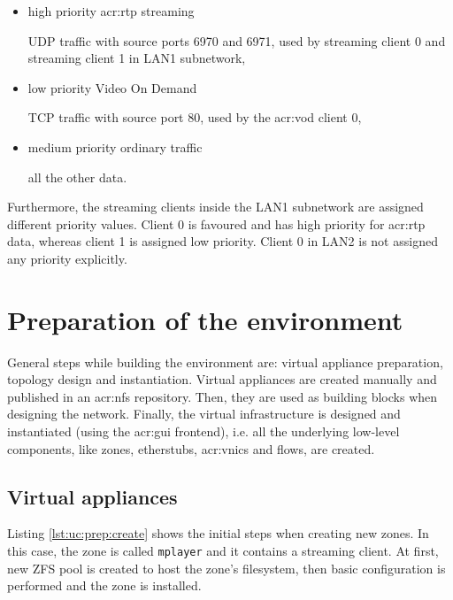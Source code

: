 \documentclass[11pt,openany]{book}
\begin{document}
        \begin{itemize}

          \item high priority \gls{acr:rtp} streaming

                UDP traffic with source ports 6970 and 6971, used by streaming client 0
                and streaming client 1 in LAN1 subnetwork,

          \item low priority Video On Demand
          
                TCP traffic with source port 80, used by the \gls{acr:vod} client 0,

          \item medium priority ordinary traffic
          
                all the other data.

        \end{itemize}

        Furthermore, the streaming clients inside the LAN1 subnetwork are assigned different priority values. Client 0
        is favoured and has high priority for \gls{acr:rtp} data, whereas client 1 is assigned low priority. Client 0 in
        LAN2 is not assigned any priority explicitly.


    \section{Preparation of the environment}
    \label{sec:uc:prep}

      General steps while building the environment are: virtual appliance preparation, topology design and
      instantiation. Virtual appliances are created manually and published in an \gls{acr:nfs} repository. Then, they
      are used as building blocks when designing the network. Finally, the virtual infrastructure is designed and
      instantiated (using the \gls{acr:gui} frontend), i.e.  all the underlying low-level components, like zones,
      etherstubs, \gls{acr:vnic}s and flows, are created.


      \subsection{Virtual appliances}
      \label{ssub:case:prep:va}

        Listing \ref{lst:uc:prep:create} shows the initial steps when creating new zones. In this case, the zone is
        called \texttt{mplayer} and it contains a streaming client. At first, new ZFS pool is created to host the zone's
        filesystem, then basic configuration is performed and the zone is installed. \\
\end{document}
